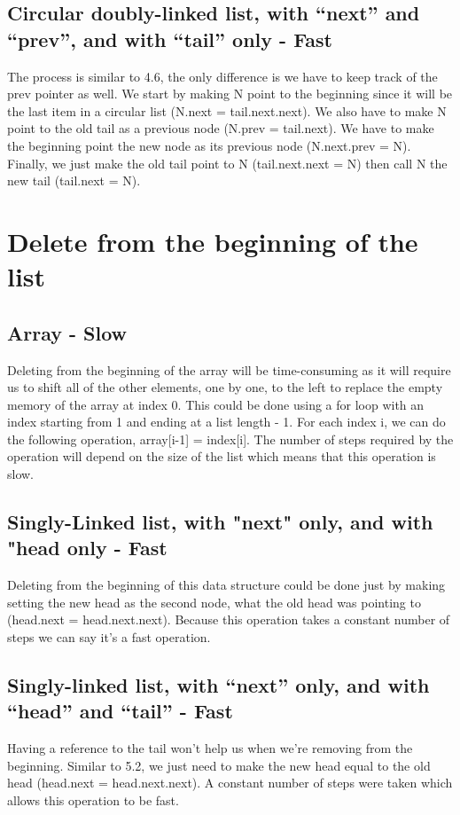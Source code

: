 \documentclass{article}
\begin{document}
\subsection{Circular doubly-linked list, with “next” and “prev”, and with “tail” only - Fast}
The process is similar to 4.6, the only difference is we have to keep track of the prev pointer as well. We start by making N point to the beginning since it will be the last item in a circular list (N.next = tail.next.next). We also have to make N point to the old tail as a previous node (N.prev = tail.next). We have to make the beginning point the new node as its previous node (N.next.prev = N). Finally, we just make the old tail point to N (tail.next.next = N) then call N the new tail (tail.next = N).



\section{Delete from the beginning of the list}

\subsection{Array - Slow}
Deleting from the beginning of the array will be time-consuming as it will require us to shift all of the other elements, one by one, to the left to replace the empty memory of the array at index 0. This could be done using a for loop with an index starting from 1 and ending at a list length - 1. For each index i, we can do the following operation, array[i-1] = index[i]. The number of steps required by the operation will depend on the size of the list which means that this operation is slow.

\subsection{Singly-Linked list, with "next" only, and with "head only - Fast}
Deleting from the beginning of this data structure could be done just by making setting the new head as the second node, what the old head was pointing to (head.next = head.next.next). Because this operation takes a constant number of steps we can say it's a fast operation.

\subsection{Singly-linked list, with “next” only, and with “head” and “tail” - Fast}
Having a reference to the tail won't help us when we're removing from the beginning. Similar to 5.2, we just need to make the new head equal to the old head (head.next = head.next.next). A constant number of steps were taken which allows this operation to be fast.
\end{document}
